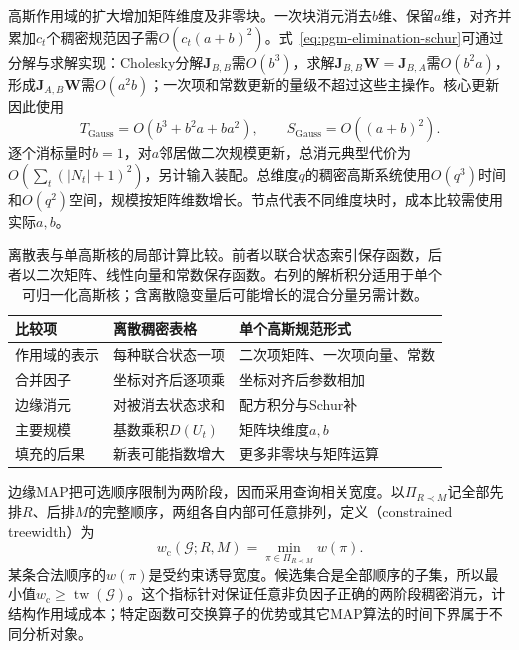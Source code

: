 高斯作用域的扩大增加矩阵维度及非零块。一次块消元消去$b$维、保留$a$维，对齐并累加$c_t$个稠密规范因子需$O(c_t(a+b)^2)$。式~\eqref{eq:pgm-elimination-schur}可通过分解与求解实现：Cholesky分解$\bm{J}_{B,B}$需$O(b^3)$，求解$\bm{J}_{B,B}\bm{W}=\bm{J}_{B,A}$需$O(b^2a)$，形成$\bm{J}_{A,B}\bm{W}$需$O(a^2b)$；一次项和常数更新的量级不超过这些主操作。核心更新因此使用
\begin{equation}
  T_{\mathrm{Gauss}}
  =O(b^3+b^2a+ba^2),\qquad
  S_{\mathrm{Gauss}}=O((a+b)^2).
  \label{eq:pgm-elimination-gaussian-cost}
\end{equation}
逐个消标量时$b=1$，对$a$邻居做二次规模更新，总消元典型代价为$O(\sum_t(|N_t|+1)^2)$，另计输入装配。总维度$q$的稠密高斯系统使用$O(q^3)$时间和$O(q^2)$空间，规模按矩阵维数增长。节点代表不同维度块时，成本比较需使用实际$a,b$。

\begin{table}[htbp]
  \centering
  \begin{tabularx}{\linewidth}{@{}lXX@{}}
    \toprule
    比较项 & 离散稠密表格 & 单个高斯规范形式\\
    \midrule
    作用域的表示 & 每种联合状态一项 & 二次项矩阵、一次项向量、常数\\
    合并因子 & 坐标对齐后逐项乘 & 坐标对齐后参数相加\\
    边缘消元 & 对被消去状态求和 & 配方积分与Schur补\\
    主要规模 & 基数乘积$D(U_t)$ & 矩阵块维度$a,b$\\
    填充的后果 & 新表可能指数增大 & 更多非零块与矩阵运算\\
    \bottomrule
  \end{tabularx}
  \caption{离散表与单高斯核的局部计算比较。前者以联合状态索引保存函数，后者以二次矩阵、线性向量和常数保存函数。右列的解析积分适用于单个可归一化高斯核；含离散隐变量后可能增长的混合分量另需计数。}
  \label{tab:pgm-elimination-representation-cost}
\end{table}

边缘MAP把可选顺序限制为两阶段，因而采用查询相关宽度。以$\Pi_{R\prec M}$记全部先排$R$、后排$M$的完整顺序，两组各自内部可任意排列，定义（constrained treewidth）为
\begin{equation}
  w_{\mathrm{c}}(\mathcal{G};R,M)
  =\min_{\pi\in\Pi_{R\prec M}}w(\pi).
  \label{eq:pgm-elimination-constrained-width}
\end{equation}
某条合法顺序的$w(\pi)$是受约束诱导宽度。候选集合是全部顺序的子集，所以最小值$w_{\mathrm{c}}\geq\operatorname{tw}(\mathcal{G})$。这个指标针对保证任意非负因子正确的两阶段稠密消元，计结构作用域成本；特定函数可交换算子的优势或其它MAP算法的时间下界属于不同分析对象。

